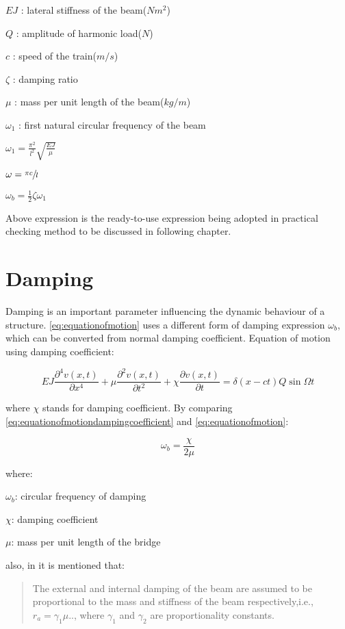 $EJ$ : lateral stiffness of the beam($Nm^2$)

$Q$ : amplitude of harmonic load($N$)

$c$ : speed of the train($m/s$)

$\zeta$ : damping ratio

$\mu$ : mass per unit length of the beam($kg/m$)

$\omega_1$ : first natural circular frequency of the beam

$\omega_1=\frac{\pi^2}{l^2}\sqrt{\frac{EJ}{\mu}}$

$\omega = \sfrac{\pi c}{l}$

$\omega_b = \frac{1}{2}\zeta\omega_1 $


 
Above expression is the ready-to-use expression being adopted in practical checking method to be discussed in following chapter.


\section{Damping}
Damping is an important parameter influencing the dynamic behaviour of a structure. \ref{eq:equationofmotion} uses a different form of damping expression $\omega_b$, which can be converted from normal damping coefficient. Equation of motion using damping coefficient:

\begin{equation}\label{eq:equationofmotiondampingcoefficient}
    EJ\frac{\partial^4 v(x,t)}{\partial x^4} + \mu\frac{\partial^2 v(x,t)}{\partial t^2} +\chi \frac{\partial v(x,t)}{\partial t} = \delta(x-ct)Q\sin\Omega t 
\end{equation}

where $\chi$ stands for damping coefficient. By comparing \ref{eq:equationofmotiondampingcoefficient} and \ref{eq:equationofmotion}:

\begin{equation}
    \omega_b = \frac{\chi}{2\mu}
\end{equation}

where:

$\omega_b$: circular frequency of damping

$\chi$: damping coefficient

$\mu$: mass per unit length of the bridge

also, in \cite[Page.704]{abu2000vibration} it is mentioned that:

\begin{quote}
    The external and internal damping of the beam are assumed to be proportional to the mass and stiffness of the beam respectively,i.e., $r_a = \gamma_1 \mu$.., where $\gamma_1$ and $\gamma_2$ are proportionality constants.
\end{quote}

